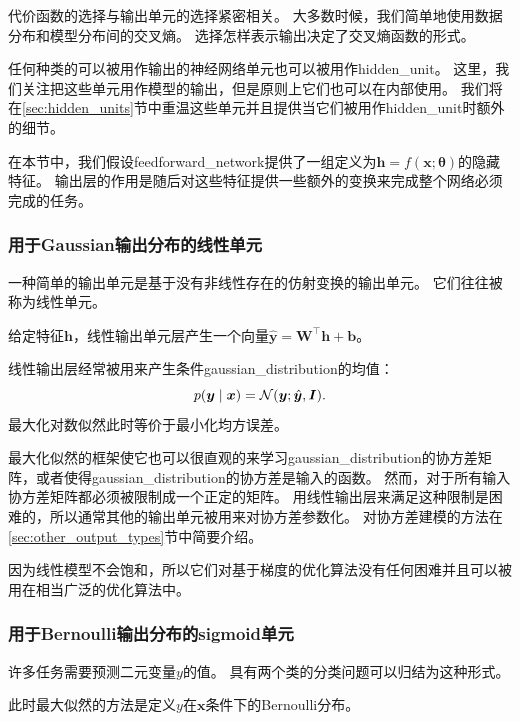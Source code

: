 代价函数的选择与输出单元的选择紧密相关。
大多数时候，我们简单地使用数据分布和模型分布间的交叉熵。
选择怎样表示输出决定了交叉熵函数的形式。

任何种类的可以被用作输出的神经网络单元也可以被用作\gls{hidden_unit}。
这里，我们关注把这些单元用作模型的输出，但是原则上它们也可以在内部使用。
我们将在\ref{sec:hidden_units}节中重温这些单元并且提供当它们被用作\gls{hidden_unit}时额外的细节。

在本节中，我们假设\gls{feedforward_network}提供了一组定义为$\bm{h}=f(\bm{x};\bm{\theta})$的隐藏特征。
输出层的作用是随后对这些特征提供一些额外的变换来完成整个网络必须完成的任务。


\subsubsection{用于Gaussian输出分布的线性单元}
\label{sec:linear_units_for_gaussian_output_distributions}

一种简单的输出单元是基于没有非线性存在的仿射变换的输出单元。
它们往往被称为线性单元。

给定特征$\bm{h}$，线性输出单元层产生一个向量$\hat{\bm{y}} = \bm{W}^\top \bm{h}+\bm{b}$。

线性输出层经常被用来产生条件\gls{gaussian_distribution}的均值：
\begin{equation}
p(\bm{y}\mid\bm{x}) = \mathcal{N}(\bm{y}; \hat{\bm{y}}, \bm{I} ).
\end{equation}
最大化对数似然此时等价于最小化均方误差。

最大化似然的框架使它也可以很直观的来学习\gls{gaussian_distribution}的协方差矩阵，或者使得\gls{gaussian_distribution}的协方差是输入的函数。
然而，对于所有输入协方差矩阵都必须被限制成一个正定的矩阵。
用线性输出层来满足这种限制是困难的，所以通常其他的输出单元被用来对协方差参数化。
对协方差建模的方法在\ref{sec:other_output_types}节中简要介绍。

因为线性模型不会饱和，所以它们对基于梯度的优化算法没有任何困难并且可以被用在相当广泛的优化算法中。

\subsubsection{用于Bernoulli输出分布的sigmoid单元}
\label{sec:sigmoid_units_for_bernoulli_output_distributions}

许多任务需要预测二元变量$y$的值。
具有两个类的分类问题可以归结为这种形式。

此时最大似然的方法是定义$y$在$\bm{x}$条件下的Bernoulli分布。

